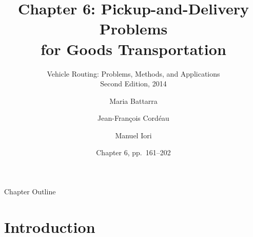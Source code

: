 \documentclass[aspectratio=169,10pt]{beamer}
\title[Chapter 6: PDP for Goods]{%
  Chapter 6: Pickup-and-Delivery Problems\\for Goods Transportation}
\subtitle{Vehicle Routing: Problems, Methods, and Applications\\
  Second Edition, 2014}
\author[Battarra, Cord\'{e}au, Iori]{%
  Maria Battarra \and Jean-Fran\c{c}ois Cord\'{e}au \and Manuel Iori}
\date{Chapter 6, pp.\ 161--202}
\begin{document}

\begin{frame}
  \titlepage
\end{frame}

\begin{frame}[allowframebreaks]{Chapter Outline}
  \tableofcontents
\end{frame}

\section{Introduction}
\end{document}
